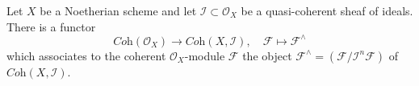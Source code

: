\noindent
Let $X$ be a Noetherian scheme and let $\mathcal{I} \subset \mathcal{O}_X$
be a quasi-coherent sheaf of ideals. There is a functor
\begin{equation}
\label{equation-completion-functor}
\textit{Coh}(\mathcal{O}_X) \longrightarrow \textit{Coh}(X, \mathcal{I}), \quad
\mathcal{F} \longmapsto \mathcal{F}^\wedge
\end{equation}
which associates to the coherent $\mathcal{O}_X$-module $\mathcal{F}$
the object $\mathcal{F}^\wedge = (\mathcal{F}/\mathcal{I}^n\mathcal{F})$
of $\textit{Coh}(X, \mathcal{I})$.